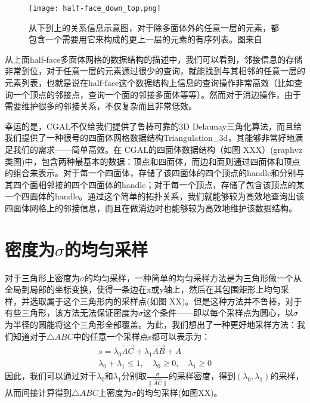 \begin{figure}[htbp]
    \centering
    \texttt{[image: half-face\_down\_top.png]}
    \caption{从下到上的关系信息示意图，对于除多面体外的任意一层的元素，都包含一个需要用它来构成的更上一层的元素的有序列表。图来自\cite{open-volume-mesh}}
    \label{fig:half-face-down-top}
\end{figure}
从上面half-face多面体网格的数据结构的描述中，我们可以看到，邻接信息的存储非常到位，对于任意一层的元素通过很少的查询，就能找到与其相邻的任意一层的元素列表，也就是说在half-face这个数据结构上信息的查询操作非常高效（比如查询一个顶点的邻接点，查询一个面的邻接多面体等等）。然而对于消边操作，由于需要维护很多的邻接关系，不仅复杂而且非常低效。\par
幸运的是，CGAL不仅给我们提供了鲁棒可靠的3D Delaunay三角化算法，而且给我们提供了一种很号的四面体网格数据结构Triangulation\_3d，其能够非常好地满足我们的需求——简单高效。在 CGAL的四面体数据结构（如图 XXX）(graphvz 类图)中，包含两种最基本的数据：顶点和四面体，而边和面则通过四面体和顶点的组合来表示。对于每一个四面体，存储了该四面体的四个顶点的handle和分别与其四个面相邻接的四个四面体的handle；对于每一个顶点，存储了包含该顶点的某一个四面体的handle。通过这个简单的拓扑关系，我们就能够较为高效地查询出该四面体网格上的邻接信息，而且在做消边时也能够较为高效地维护该数据结构。

\section{密度为$\sigma$的均匀采样}
对于三角形上密度为$\sigma$的均匀采样，一种简单的均匀采样方法是为三角形做一个从全局到局部的坐标变换，使得一条边在x或y轴上，然后在其包围矩形上均匀采样，并选取属于这个三角形内的采样点(如图 XX)。但是这种方法并不鲁棒，对于有些三角形，该方法无法保证密度为$\sigma$这个条件——即以每个采样点为圆心，以$\sigma$为半径的圆能将这个三角形全部覆盖。为此，我们想出了一种更好地采样方法：我们知道对于$\triangle ABC$中的任意一个采样点s都可以表示为：
\begin{equation}
  \begin{split}
    s = \lambda_0 \overrightarrow{AC}+\lambda_1 \overrightarrow{AB} + A\\
    \lambda_0 + \lambda_1 \leq 1, \quad \lambda_0 \geq 0, \quad \lambda_1 \geq 0
  \end{split}
\end{equation}
因此，我们可以通过对于$\lambda_0$和$\lambda_1$分别取$\frac{\sigma}{\parallel \overrightarrow{AC} \parallel}$的采样密度，得到$(\lambda_0,\lambda_1)$的采样，从而间接计算得到$\triangle ABC$上密度为$\sigma$的均匀采样(如图XX)。
